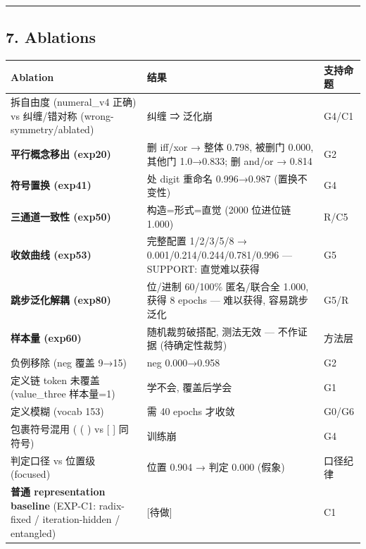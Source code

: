 \documentclass[
]{article}
\begin{document}
\begin{center}\rule{0.5\linewidth}{0.5pt}\end{center}

\subsection{7. Ablations}\label{ablations}

\begin{longtable}[]{@{}
  >{\raggedright\arraybackslash}p{}
  >{\raggedright\arraybackslash}p{}
  >{\raggedright\arraybackslash}p{}@{}}
\toprule\noalign{}
\begin{minipage}[b]{\linewidth}\raggedright
Ablation
\end{minipage} & \begin{minipage}[b]{\linewidth}\raggedright
结果
\end{minipage} & \begin{minipage}[b]{\linewidth}\raggedright
支持命题
\end{minipage} \\
\midrule\noalign{}
\endhead
\bottomrule\noalign{}
\endlastfoot
拆自由度 (numeral\_v4 正确) vs 纠缠/错对称 (wrong-symmetry/ablated) &
纠缠 ⇒ 泛化崩 & G4/C1 \\
\textbf{平行概念移出 (exp20)} & 删 iff/xor → 整体 0.798, 被删门 0.000,
其他门 1.0→0.833; 删 and/or → 0.814 & G2 \\
\textbf{符号置换 (exp41)} & 26080 处 digit 重命名 0.996→0.987
(置换不变性) & G4 \\
\textbf{三通道一致性 (exp50)} & 构造=形式=直觉 (2000 位进位链 1.000) &
R/C5 \\
\textbf{收敛曲线 (exp53)} & 完整配置 1/2/3/5/8 →
0.001/0.214/0.244/0.781/0.996 --- SUPPORT: 直觉难以获得 & G5 \\
\textbf{跳步泛化解耦 (exp80)} & 2000 位/进制 60/100\% 匿名/联合全 1.000,
获得 8 epochs --- 难以获得, 容易跳步泛化 & G5/R \\
\textbf{样本量 (exp60)} & 随机裁剪破搭配, 测法无效 --- 不作证据
(待确定性裁剪) & 方法层 \\
负例移除 (neg 覆盖 9→15) & neg 0.000→0.958 & G2 \\
定义链 token 未覆盖 (value\_three 样本量=1) & 学不会, 覆盖后学会 & G1 \\
定义模糊 (vocab 153) & 需 40 epochs 才收敛 & G0/G6 \\
包裹符号混用 ( ( ) vs {[} {]} 同符号) & 训练崩 & G4 \\
判定口径 vs 位置级 (focused) & 位置 0.904 → 判定 0.000 (假象) &
口径纪律 \\
\textbf{普通 representation baseline} (EXP-C1: radix-fixed /
iteration-hidden / entangled) & {[}待做{]} & C1 \\
\end{longtable}
\end{document}
